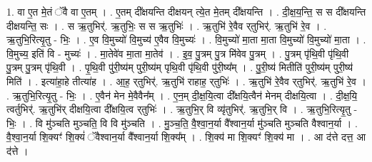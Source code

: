 \documentclass[17pt]{extarticle}
\begin{document}
1. वा ए॒त मे॒तं ॅवै वा ए॒तम् । . ए॒तम् दी᳚क्षयन्ति दीक्षयन् त्ये॒त मे॒तम् दी᳚क्षयन्ति । . दी॒क्ष॒य॒न्ति॒ स स दी᳚क्षयन्ति दीक्षयन्ति॒ सः । . स ऋ॒तुभिर्॑. ऋ॒तुभिः॒ स स ऋ॒तुभिः॑ । . ऋ॒तुभि॑ रे॒वैव र्‌तुभिर्॑. ऋ॒तुभि॑ रे॒व । . ऋ॒तुभि॒रित्यृ॒तु - भिः॒ । . ए॒व वि॒मुच्यो॑ वि॒मुच्य॑ ए॒वैव वि॒मुच्यः॑ । . वि॒मुच्यो॑ मा॒ता मा॒ता वि॒मुच्यो॑ वि॒मुच्यो॑ मा॒ता । . वि॒मुच्य॒ इति॑ वि - मुच्यः॑ । . मा॒तेवे॑व मा॒ता मा॒तेव॑ । . इ॒व॒ पु॒त्रम् पु॒त्र मि॑वेव पु॒त्रम् । . पु॒त्रम् पृ॑थि॒वी पृ॑थि॒वी पु॒त्रम् पु॒त्रम् पृ॑थि॒वी । . पृ॒थि॒वी पु॑री॒ष्य॑म् पुरी॒ष्य॑म् पृथि॒वी पृ॑थि॒वी पु॑री॒ष्य᳚म् । . पु॒री॒ष्य॑ मितीति॑ पुरी॒ष्य॑म् पुरी॒ष्य॑ मिति॑ । . इत्या॑हा॒हे तीत्या॑ह । . आ॒ह॒ र्‌तुभिर्॑. ऋ॒तुभि॑ राहाह॒ र्‌तुभिः॑ । . ऋ॒तुभि॑ रे॒वैव र्‌तुभिर्॑. ऋ॒तुभि॑ रे॒व । . ऋ॒तुभि॒रित्यृ॒तु - भिः॒ । . ए॒वैन॑ मेन मे॒वैवैन᳚म् । . ए॒न॒म् दी॒क्ष॒यि॒त्वा दी᳚क्षयि॒त्वैन॑ मेनम् दीक्षयि॒त्वा । . दी॒क्ष॒यि॒ त्वर्तुभिर्॑. ऋ॒तुभि॑र् दीक्षयि॒त्वा दी᳚क्षयि॒त्व र्‌तुभिः॑ । . ऋ॒तुभि॒र् वि व्यृ॑तुभिर्॑. ऋ॒तुभि॒र् वि । . ऋ॒तुभि॒रित्यृ॒तु - भिः॒ । . वि मु॑ञ्चति मुञ्चति॒ वि वि मु॑ञ्चति । . मु॒ञ्च॒ति॒ वै॒श्वा॒न॒र्या वै᳚श्वान॒र्या मु॑ञ्चति मुञ्चति वैश्वान॒र्या । . वै॒श्वा॒न॒र्या शि॒क्यꣳ॑ शि॒क्यं॑ ॅवैश्वान॒र्या वै᳚श्वान॒र्या शि॒क्य᳚म् । . शि॒क्य॑ मा शि॒क्यꣳ॑ शि॒क्य॑ मा । . आ द॑त्ते दत्त॒ आ द॑त्ते । \newline
\end{document}
